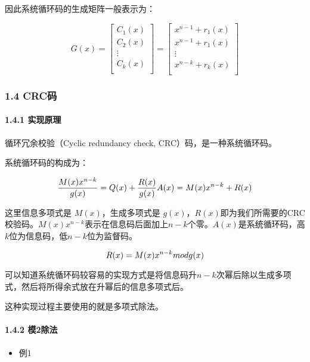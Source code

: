 \documentclass[
]{article}
\begin{document}
因此系统循环码的生成矩阵一般表示为：

$$
G(x)=
\left[
\begin{matrix}
C_1(x)\\
C_2(x)\\
 \vdots \\
C_k(x)\\
\end{matrix}
\right]
=
\left[
\begin{matrix}
x^{n-1}+r_1(x)\\
x^{n-1}+r_1(x)\\
 \vdots \\
x^{n-k}+r_k(x)\\
\end{matrix}
\right]
$$

\hypertarget{header-n78}{%
\subsubsection{1.4 CRC码}\label{header-n78}}

\hypertarget{header-n79}{%
\paragraph{1.4.1 实现原理}\label{header-n79}}

循环冗余校验（Cyclic redundancy check, CRC）码，是一种系统循环码。

系统循环码的构成为：

$$
\frac{M(x)x^{n-k}}{g(x)} = Q(x) + \frac{R(x)}{g(x)}\\
A(x)=M(x)x^{n-k}+R(x)
$$

这里信息多项式是 $M(x)$，生成多项式是
$g(x)$，$R(x)$即为我们所需要的CRC校验码。$M(x)x^{n-k}$表示在信息码后面加上$n-k$个零。$A(x)$是系统循环码，高$k$位为信息码，低$n-k$位为监督码。

$$
R(x)=M(x)x^{n-k} \space mod \space g(x)
$$

可以知道系统循环码较容易的实现方式是将信息码升$n-k$次幂后除以生成多项式，然后将所得余式放在升幂后的信息多项式后。

这种实现过程主要使用的就是多项式除法。

\hypertarget{header-n87}{%
\paragraph{1.4.2 模2除法}\label{header-n87}}

\begin{itemize}
\item
  例1
\end{itemize}
\end{document}
